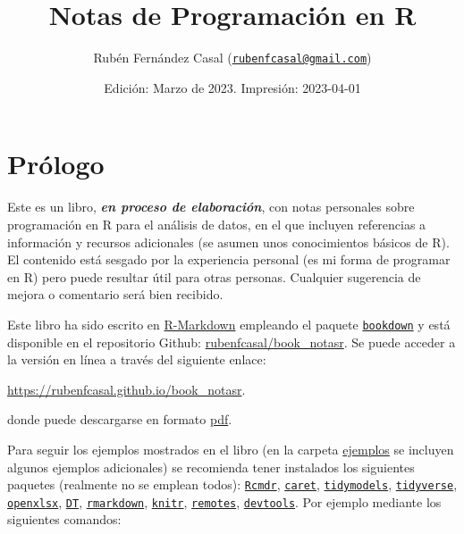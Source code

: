\documentclass[
]{book}
\title{Notas de Programación en R}
\author{Rubén Fernández Casal (\href{mailto:rubenfcasal@gmail.com}{\nolinkurl{rubenfcasal@gmail.com}})}
\date{Edición: Marzo de 2023. Impresión: 2023-04-01}
\theoremstyle{break}
\theoremstyle{nonumberplain}
\begin{document}
\maketitle

{
\setcounter{tocdepth}{1}
\tableofcontents
}
\hypertarget{pruxf3logo}{%
\chapter*{Prólogo}\label{pruxf3logo}}

Este es un libro, \textbf{\emph{en proceso de elaboración}}, con notas personales sobre programación en R para el análisis de datos, en el que incluyen referencias a información y recursos adicionales (se asumen unos conocimientos básicos de R).
El contenido está sesgado por la experiencia personal (es mi forma de programar en R) pero puede resultar útil para otras personas.
Cualquier sugerencia de mejora o comentario será bien recibido.

Este libro ha sido escrito en \href{http://rmarkdown.rstudio.com}{R-Markdown} empleando el paquete \href{https://bookdown.org/yihui/bookdown/}{\texttt{bookdown}} y está disponible en el repositorio Github: \href{https://github.com/rubenfcasal/book_notasr}{rubenfcasal/book\_notasr}.
Se puede acceder a la versión en línea a través del siguiente enlace:

\url{https://rubenfcasal.github.io/book_notasr}.

donde puede descargarse en formato \href{https://rubenfcasal.github.io/book_notasr/Notas_R.pdf}{pdf}.

Para seguir los ejemplos mostrados en el libro (en la carpeta \href{https://github.com/rubenfcasal/book_notasr/tree/main/ejemplos}{ejemplos} se incluyen algunos ejemplos adicionales) se recomienda tener instalados los siguientes paquetes (realmente no se emplean todos):
\href{https://www.r-project.org}{\texttt{Rcmdr}}, \href{https://github.com/topepo/caret/}{\texttt{caret}}, \href{https://tidymodels.tidymodels.org}{\texttt{tidymodels}}, \href{https://tidyverse.tidyverse.org}{\texttt{tidyverse}}, \href{https://ycphs.github.io/openxlsx/index.html}{\texttt{openxlsx}}, \href{https://github.com/rstudio/DT}{\texttt{DT}}, \href{https://github.com/rstudio/rmarkdown}{\texttt{rmarkdown}}, \href{https://yihui.org/knitr/}{\texttt{knitr}}, \href{https://remotes.r-lib.org}{\texttt{remotes}}, \href{https://devtools.r-lib.org/}{\texttt{devtools}}.
Por ejemplo mediante los siguientes comandos:
\end{document}
